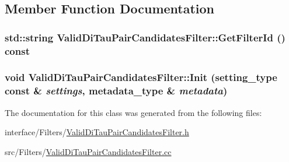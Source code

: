 \subsection{Member Function Documentation}
\hypertarget{classValidDiTauPairCandidatesFilter_ad28fb9f4f71e20fd002c2d0da938256b}{
\subsubsection[{GetFilterId}]{\setlength{\rightskip}{0pt plus 5cm}std::string ValidDiTauPairCandidatesFilter::GetFilterId () const}}
\label{classValidDiTauPairCandidatesFilter_ad28fb9f4f71e20fd002c2d0da938256b}
\hypertarget{classValidDiTauPairCandidatesFilter_a6594e03edb7fd0ef62e96947ab89f4a2}{
\subsubsection[{Init}]{\setlength{\rightskip}{0pt plus 5cm}void ValidDiTauPairCandidatesFilter::Init (setting\_\-type const \& {\em settings}, \/  metadata\_\-type \& {\em metadata})}}
\label{classValidDiTauPairCandidatesFilter_a6594e03edb7fd0ef62e96947ab89f4a2}


The documentation for this class was generated from the following files:\begin{DoxyCompactItemize}
\item 
interface/Filters/\hyperlink{ValidDiTauPairCandidatesFilter_8h}{ValidDiTauPairCandidatesFilter.h}\item 
src/Filters/\hyperlink{ValidDiTauPairCandidatesFilter_8cc}{ValidDiTauPairCandidatesFilter.cc}\end{DoxyCompactItemize}
